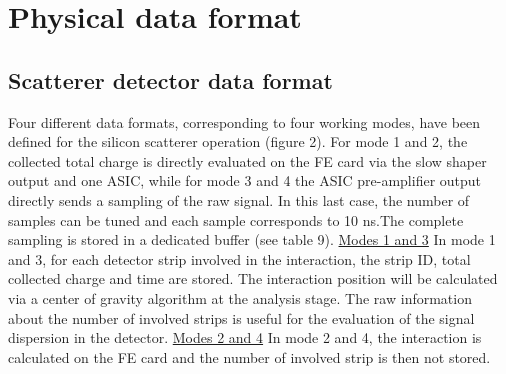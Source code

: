 

\section{Physical data format}



\subsection{Scatterer detector data format}

Four different data formats, corresponding to four working modes, have been defined for the silicon scatterer operation (figure 2). For mode 1 and 2, the collected total charge is directly evaluated on the FE card via the slow shaper output and one ASIC, while for mode 3 and 4 the ASIC pre-amplifier output directly sends a sampling of the raw signal.  In this last case, the number of samples can be tuned and each sample corresponds to 10 ns.The complete sampling is stored in a dedicated buffer (see table 9).\newline\newline
\underline{Modes 1 and 3}\newline
In mode 1 and 3, for each detector strip involved in the interaction, the strip ID, total collected charge and time are stored. The interaction position will be calculated via a center of gravity algorithm at the analysis stage. The raw information about the number of involved strips is useful for the evaluation of the signal dispersion in the detector.\newline
\underline{Modes 2 and 4}\newline
In mode 2 and 4, the interaction is calculated on the FE card and the number of involved strip is then not stored.

